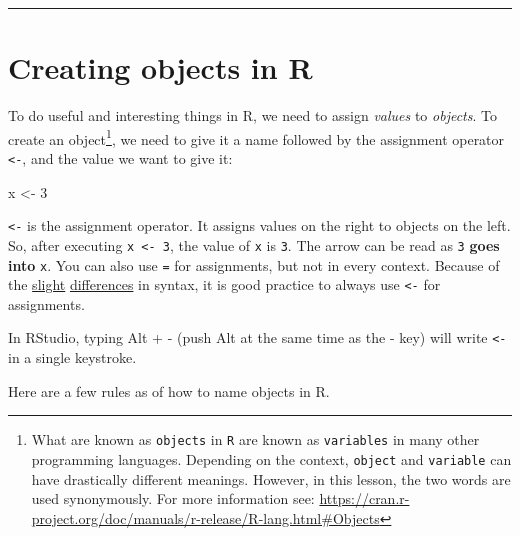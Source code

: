 \documentclass[
]{book}
\newenvironment{Shaded}{\begin{snugshade}}{\end{snugshade}}
\newcommand{\DecValTok}[1]{\textcolor[rgb]{0.00,0.00,0.81}{#1}}
\newcommand{\NormalTok}[1]{#1}
\newcommand{\OtherTok}[1]{\textcolor[rgb]{0.56,0.35,0.01}{#1}}
\begin{document}
\begin{center}\rule{0.5\linewidth}{0.5pt}\end{center}

\section{Creating objects in R}\label{creating-objects-in-r}

To do useful and interesting things in R, we need to assign \emph{values} to
\emph{objects}. To create an object\footnote{What are known as \texttt{objects} in \texttt{R} are known as \texttt{variables} in many other programming languages. Depending on the context, \texttt{object} and \texttt{variable} can
  have drastically different meanings. However, in this lesson, the two words are
  used synonymously. For more information see:
  \url{https://cran.r-project.org/doc/manuals/r-release/R-lang.html\#Objects}}, we need to give it a name followed by the assignment operator \texttt{\textless{}-}, and the value we want to give it:

\begin{Shaded}
\begin{Highlighting}[]
\NormalTok{ x }\OtherTok{\textless{}{-}} \DecValTok{3}
\end{Highlighting}
\end{Shaded}

\texttt{\textless{}-} is the assignment operator. It assigns values on the right to objects on
the left. So, after executing \texttt{x\ \textless{}-\ 3}, the value of \texttt{x} is \texttt{3}. The arrow can
be read as \texttt{3} \textbf{goes into} \texttt{x}. You can also use \texttt{=}
for assignments, but not in every context. Because of
the
\href{http://blog.revolutionanalytics.com/2008/12/use-equals-or-arrow-for-assignment.html}{slight} \href{https://web.archive.org/web/20130610005305/https://stat.ethz.ch/pipermail/r-help/2009-March/191462.html}{differences} in
syntax, it is good practice to always use \texttt{\textless{}-} for assignments.

In RStudio, typing Alt + - (push Alt at the
same time as the - key) will write \texttt{\textless{}-} in a single keystroke.

Here are a few rules as of how to name objects in R.
\end{document}

